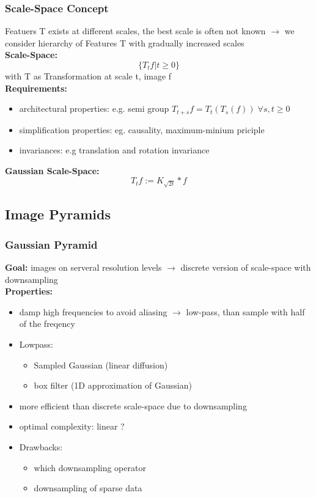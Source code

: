 \documentclass[11pt]{article}
\begin{document}
\subsubsection{Scale-Space Concept}
\label{sec-2-1-3}
Featuers T exists at different scales, the best scale is often not known
$\rightarrow$ we consider hierarchy of Features T with gradually increased scales\\
    \textbf{Scale-Space:}
$$ \{T_tf | t \ge 0\} $$
with T as Transformation at scale t, image f \\
    \textbf{Requirements:}
\begin{itemize}
\item architectural properties: e.g. semi group $T_{t+s}f = T_t(T_s(f))\; \forall s,t \ge 0$
\item simplification properties: eg. causality, maximum-minium priciple
\item invariances: e.g translation and rotation invariance
\end{itemize}
\textbf{Gaussian Scale-Space:}
$$ T_tf := K_{\sqrt{2t}}*f $$
\subsection{Image Pyramids}
\label{sec-2-2}
\subsubsection{Gaussian Pyramid}
\label{sec-2-2-1}
\textbf{Goal:} images on serveral resolution levels $\rightarrow$ discrete version of
scale-space with downsampling\\
    \textbf{Properties:}
\begin{itemize}
\item damp high frequencies to avoid aliasing $\rightarrow$ low-pass, than sample with half
of the freqency
\item Lowpass: 
\begin{itemize}
\item Sampled Gaussian (linear diffusion)
\item box filter (1D approximation of Gaussian)
\end{itemize}
\item more efficient than discrete scale-space due to downsampling
\item optimal complexity: linear ?
\item Drawbacks:
\begin{itemize}
\item which downsampling operator
\item downsampling of sparse data
\end{itemize}
\end{itemize}
\end{document}
